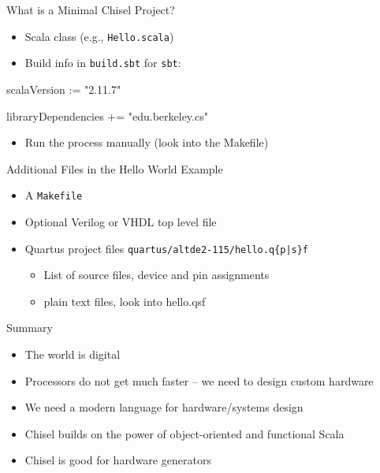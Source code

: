 \documentclass[xcolor=pdflatex,dvipsnames,table]{beamer}
\newcommand{\code}[1]{{\texttt{#1}}}
\begin{document}
\begin{frame}[fragile]{What is a Minimal Chisel Project?}
\begin{itemize}
\item Scala class (e.g., \code{Hello.scala})
\item Build info in \code{build.sbt} for \code{sbt}:
\end{itemize}
\begin{chisel}
scalaVersion := "2.11.7"

libraryDependencies += "edu.berkeley.cs" %
\end{chisel}
\begin{itemize}
\item Run the process manually (look into the Makefile)
\end{itemize}
\end{frame}

\begin{frame}[fragile]{Additional Files in the Hello World Example}
\begin{itemize}
\item A \code{Makefile}
\item Optional Verilog or VHDL top level file %
\item Quartus project files \code{quartus/altde2-115/hello.q\{p|s\}f}
\begin{itemize}
\item List of source files, device and pin assignments
\item plain text files, look into hello.qsf
\end{itemize}
\end{itemize}
\end{frame}

\begin{frame}[fragile]{Summary}
\begin{itemize}
\item The world is digital
\item Processors do not get much faster -- we need to design custom hardware
\item We need a modern language for hardware/systems design
\item Chisel builds on the power of object-oriented and functional Scala
\item Chisel is good for hardware generators
\end{itemize}
\end{frame}
\end{document}
